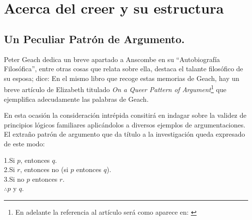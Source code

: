 \section{Acerca del creer y su estructura}

\subsection{Un Peculiar Patrón de Argumento.}
Peter Geach dedica un breve apartado a Anscombe en su ``Autobiografía
Filosófica'', entre otras cosas que relata sobre ella, destaca el talante
filosófico de su esposa; dice:  En el mismo
libro que recoge estas memorias de Geach, hay un breve artículo de Elizabeth
titulado \emph{On a Queer Pattern of Argument}\footnote{\cite{anscombe1991aqp}
  En adelante la referencia al artículo será como aparece en:
  \cite{anscombe2015logic:qpa}} que ejemplifica adecudamente las palabras de
Geach.

En esta ocasión la consideración intrépida consitirá en indagar sobre la validez
de principios lógicos familiares aplicándolos a diversos ejemplos de
argumentaciones. El extraño patrón de argumento que da título a la investigación
queda expresado de este modo:
  \begin{adjustwidth}{1.2cm}{}
    1.\hspace{.5cm}Si $p$, entonces $q$.\\
    2.\hspace{.5cm}Si $r$, entonces no (si $p$ entonces $q$).\\
    3.\hspace{.5cm}Si no $p$ entonces $r$.\\
    $\therefore$\hspace{.5cm}$p$ y $q$.
  \end{adjustwidth}

